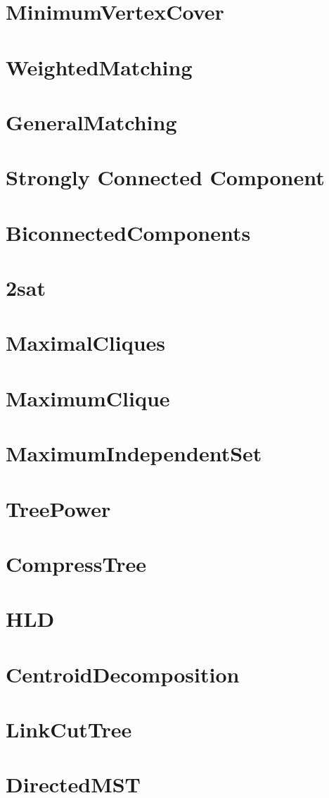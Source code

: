 \section{MinimumVertexCover}
\section{WeightedMatching}
\section{GeneralMatching}

\section{Strongly Connected Component}
\section{BiconnectedComponents}
\section{2sat}

\section{MaximalCliques}
\section{MaximumClique}
\section{MaximumIndependentSet}

\section{TreePower}
\section{CompressTree}
\section{HLD}
\section{CentroidDecomposition}
\section{LinkCutTree}
\section{DirectedMST}
